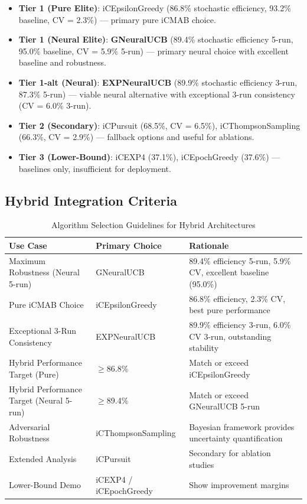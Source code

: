 \documentclass[12pt,a4paper]{article}
\newcommand{\legacy}[1]{\textcolor{legacycolor}{\textbf{#1}}}
\newcommand{\neural}[1]{\textcolor{neuralcolor}{\textbf{#1}}}
\begin{document}
\begin{itemize}
\item \textbf{Tier 1 (Pure Elite)}: iCEpsilonGreedy (86.8\% stochastic efficiency, 93.2\% baseline, CV = 2.3\%) --- primary pure iCMAB choice.
\item \textbf{Tier 1 (Neural Elite)}: \neural{GNeuralUCB} (89.4\% stochastic efficiency 5-run, 95.0\% baseline, CV = 5.9\% 5-run) --- primary neural choice with excellent baseline and robustness.
\item \textbf{Tier 1-alt (Neural)}: \legacy{EXPNeuralUCB} (89.9\% stochastic efficiency 3-run, 87.3\% 5-run) --- viable neural alternative with exceptional 3-run consistency (CV = 6.0\% 3-run).
\item \textbf{Tier 2 (Secondary)}: iCPursuit (68.5\%, CV = 6.5\%), iCThompsonSampling (66.3\%, CV = 2.9\%) --- fallback options and useful for ablations.
\item \textbf{Tier 3 (Lower-Bound)}: iCEXP4 (37.1\%), iCEpochGreedy (37.6\%) --- baselines only, insufficient for deployment.
\end{itemize}

\subsection{Hybrid Integration Criteria}

\begin{table}[H]
\centering
\caption{Algorithm Selection Guidelines for Hybrid Architectures}
\begin{tabular}{@{}lll@{}}
\toprule
\textbf{Use Case} & \textbf{Primary Choice} & \textbf{Rationale} \\
\midrule
Maximum Robustness (Neural 5-run) & GNeuralUCB & 89.4\% efficiency 5-run, 5.9\% CV, excellent baseline (95.0\%) \\
Pure iCMAB Choice & iCEpsilonGreedy & 86.8\% efficiency, 2.3\% CV, best pure performance \\
Exceptional 3-Run Consistency & EXPNeuralUCB & 89.9\% efficiency 3-run, 6.0\% CV 3-run, outstanding stability \\
Hybrid Performance Target (Pure) & $\geq$86.8\% & Match or exceed iCEpsilonGreedy \\
Hybrid Performance Target (Neural 5-run) & $\geq$89.4\% & Match or exceed GNeuralUCB 5-run \\
Adversarial Robustness & iCThompsonSampling & Bayesian framework provides uncertainty quantification \\
Extended Analysis & iCPursuit & Secondary for ablation studies \\
Lower-Bound Demo & iCEXP4 / iCEpochGreedy & Show improvement margins \\
\bottomrule
\end{tabular}
\end{table}
\end{document}
